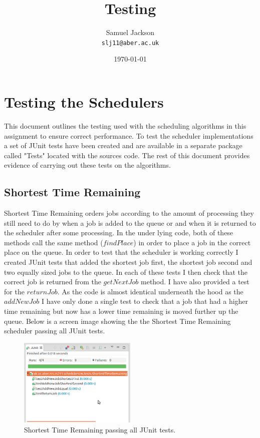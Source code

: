 \documentclass{article}
\begin{document}
\title{Testing}
\author{Samuel Jackson \\ \texttt{slj11@aber.ac.uk}}
\date{\today}
\maketitle

\newpage
\section{Testing the Schedulers}
This document outlines the testing used with the scheduling algorithms in this assignment to ensure correct performance. To test the scheduler implementations a set of JUnit tests have been created and are available in a separate package called "Tests" located with the sources code. The rest of this document provides evidence of carrying out these tests on the algorithms.

\subsection{Shortest Time Remaining}
Shortest Time Remaining orders jobs according to the amount of processing they still need to do by when a job is added to the queue or and when it is returned to the scheduler after some processing. In the under lying code, both of these methods call the same method ($findPlace$) in order to place a job in the correct place on the queue. In order to test that the scheduler is working correctly I created JUnit tests that added the shortest job first, the shortest job second and two equally sized jobs to the queue. In each of these tests I then check that the correct job is returned from the $getNextJob$ method. I have also provided a test for the $returnJob$. As the code is almost identical underneath the hood as the $addNewJob$ I have only done a single test to check that a job that had a higher time remaining but now has a lower time remaining is moved further up the queue. Below is a screen image showing the the Shortest Time Remaining scheduler passing all JUnit tests.

\begin{figure}[H]
\centering
\includegraphics[width=0.5\textwidth]{img/str_test.png}
\caption{Shortest Time Remaining passing all JUnit tests.}
\label{fig:str-test}
\end{figure}
\end{document}
